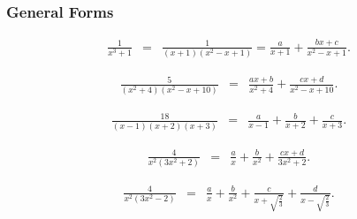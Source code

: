 \begin{frame}
  \frametitle{General Forms}

  \begin{eqnarray*}
    \frac{1}{x^3+1} & = & \frac{1}{(x+1)(x^2-x+1)}= \frac{a}{x+1} + \frac{bx+c}{x^2-x+1}.
  \end{eqnarray*}

  \begin{eqnarray*}
    \frac{5}{(x^2+4)(x^2-x+10)} & = & \frac{ax+b}{x^2+4} + \frac{cx+d}{x^2-x+10}.
  \end{eqnarray*}

  \begin{eqnarray*}
    \frac{18}{(x-1)(x+2)(x+3)} & = & \frac{a}{x-1} + \frac{b}{x+2} + \frac{c}{x+3}.
  \end{eqnarray*}


  \begin{eqnarray*}
    \frac{4}{x^2(3x^2+2)} & = & \frac{a}{x} + \frac{b}{x^2} + \frac{cx+d}{3x^2+2}.
  \end{eqnarray*}

  \begin{eqnarray*}
    \frac{4}{x^2(3x^2-2)} & = & \frac{a}{x} + \frac{b}{x^2} + \frac{c}{x+\sqrt{\frac{2}{3}}} + \frac{d}{x-\sqrt{\frac{2}{3}}}.
  \end{eqnarray*}

  
\end{frame}



